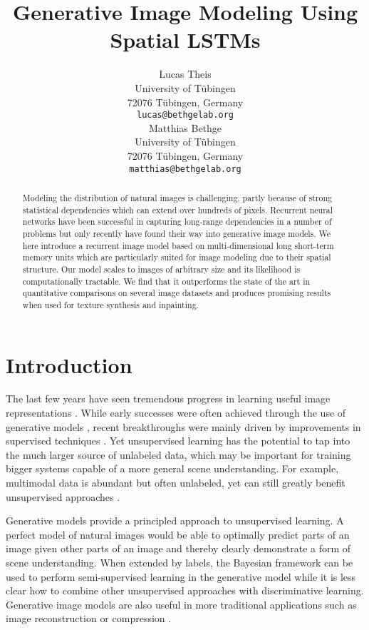 \documentclass{article}
\title{Generative Image Modeling Using Spatial LSTMs}
\author{
Lucas Theis \\
University of Tübingen \\
72076 Tübingen, Germany \\
\texttt{lucas@bethgelab.org} \\
\And
Matthias Bethge \\
University of Tübingen \\
72076 Tübingen, Germany \\
\texttt{matthias@bethgelab.org} \\
}
\begin{document}
	\maketitle

	\begin{abstract}
	Modeling the distribution of natural images is challenging, partly because of
	strong statistical dependencies which can extend over hundreds of pixels.
	Recurrent neural networks have been successful in capturing long-range dependencies
	in a number of problems but only recently have found their way into generative image
	models. We here introduce a recurrent image model based on multi-dimensional long short-term
	memory units which are particularly suited for image modeling due to their
	spatial structure. Our model scales to images of arbitrary size and its likelihood is
	computationally tractable. We find that it outperforms the state of the art in quantitative
	comparisons on several image datasets and produces promising results when used for texture
	synthesis and inpainting.
	\end{abstract}

	\section{Introduction}
The last few years have seen tremendous progress in learning useful image representations
		\cite{Donahue:2014}. While early successes were often achieved through the use of generative
		models \cite[e.g.,][]{Hinton:2006,Lee:2009,Ranzato:2011}, recent breakthroughs were mainly
		driven by improvements in supervised techniques \cite[e.g.,][]{Krizhevsky:2012,Simonyan:2015}.
		Yet unsupervised learning has the potential to tap into the much larger source of unlabeled
		data, which may be important for training bigger systems capable of a more
		general scene understanding. For example, multimodal data is abundant but often unlabeled,
		yet can still greatly benefit unsupervised approaches \cite{Srivastava:2014}.

Generative models provide a principled approach to unsupervised learning.
		A perfect model of natural images would be able to optimally predict parts of an image given other parts
		of an image and thereby clearly demonstrate a form of scene understanding.
		When extended by labels, the Bayesian framework can be used to perform semi-supervised learning
		in the generative model \cite{Ngiam:2011,Kingma:2014b} while it is less clear how
		to combine other unsupervised approaches with discriminative learning.
		Generative image models are also useful in more traditional applications such as
		image reconstruction \cite{Roth:2009,Zoran:2011,Sohl-Dickstein:2015} or compression \cite{VanDenOord:2014b}.
\end{document}
